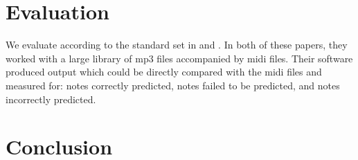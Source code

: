 \documentclass{article}
\begin{document}
\section{Evaluation}
We evaluate according to the standard set in \cite{poliner2006discriminative} and \cite{bock2012polyphonic}.
In both of these papers, they worked with a large library of mp3 files accompanied by midi files. Their software produced
output which could be directly compared with the midi files and measured for: notes correctly predicted, notes failed to be predicted,
and notes incorrectly predicted.


\section{Conclusion}




\end{document}
